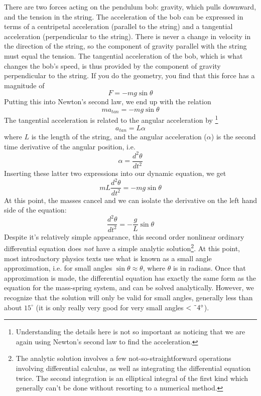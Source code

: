 \documentclass[twoside,11pt,ShortChapTitles]{BYUTextbook}
\begin{document}
There are two forces acting on the pendulum bob: gravity, which pulls
downward, and the tension in the string. The acceleration of the bob can be
expressed in terms of a centripetal acceleration (parallel to the string)
and a tangential acceleration (perpendicular to the string). There is never
a change in velocity in the direction of the string, so the component of
gravity parallel with the string must equal the tension. The tangential
acceleration of the bob, which is what changes the bob's speed, is thus
provided by the component of gravity perpendicular to the string. If you do
the geometry, you find that this force has a magnitude of 
\[
F=-mg\sin \theta 
\]%
Putting this into Newton's second law, we end up with the relation 
\[
ma_{tan}=-mg\sin \theta 
\]%
The tangential acceleration is related to the angular acceleration by%
\footnote{%
Understanding the details here is not so important as noticing that we are
again using Newton's second law to find the acceleration.} 
\[
a_{tan}=L\alpha 
\]%
where $L$ is the length of the string, and the angular acceleration ($\alpha 
$) is the second time derivative of the angular position, i.e. 
\[
\alpha =\frac{d^{2}\theta }{dt^{2}} 
\]%
Inserting these latter two expressions into our dynamic equation, we get 
\[
mL\frac{d^{2}\theta }{dt^{2}}=-mg\sin \theta 
\]%
At this point, the masses cancel and we can isolate the derivative on the
left hand side of the equation: 
\[
\frac{d^{2}\theta }{dt^{2}}=-\frac{g}{L}\sin \theta 
\]%
Despite it's relatively simple appearance, this second order nonlinear
ordinary differential equation does \emph{not} have a simple analytic
solution\footnote{%
The analytic solution involves a few not-so-straightforward operations
involving differential calculus, as well as integrating the differential
equation twice. The second integration is an elliptical integral of the
first kind which generally can't be done without resorting to a numerical
method.}. At this point, most introductory physics texts use what is known
as a small angle approximation, i.e. for small angles $\sin \theta \approx
\theta $, where $\theta $ is in radians. Once that approximation is made,
the differential equation has exactly the same form as the equation for the
mass-spring system, and can be solved analytically. However, we recognize
that the solution will only be valid for small angles, generally less than
about $15^{\circ }$ (it is only really very good for very small angles $<%
\symbol{126}4\unit{%
{{}^\circ}%
}$).
\end{document}
